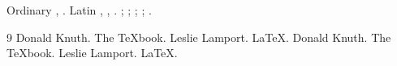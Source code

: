 \documentclass{article}
\begin{document}
Ordinary \cite{knuth}, \cite[page 23]{knuth,lamport}.
Latin , ,
.
\ifdefined\UseNatbib
  \citep{knuth,lamport}; \citet{knuth}; \citeauthor{lamport};
  \citeyear{knuth}; \citeyearpar{lamport}.
\fi
\begin{thebibliography}{9}
\ifdefined\UseNatbib
   Donald Knuth. The TeXbook.
   Leslie Lamport. LaTeX.
\else
   Donald Knuth. The TeXbook.
   Leslie Lamport. LaTeX.
\fi
\end{thebibliography}
\end{document}

